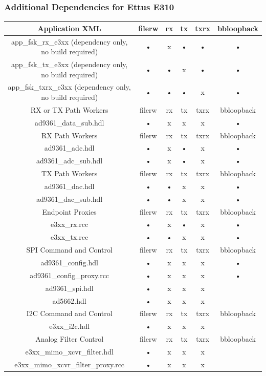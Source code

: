 \subsubsection{Additional Dependencies for Ettus E310}
	\begin{tabular}{|c|c|c|c|c|c|}
	\hline
	\rowcolor{blue}
	Application XML & filerw & rx & tx & txrx & bbloopback \\
	\hline
	app\_fsk\_rx\_e3xx (dependency only, no build required) & • & x & • & • & • \\
	\hline
	app\_fsk\_tx\_e3xx (dependency only, no build required) & • & • & x & • & • \\
	\hline
	app\_fsk\_txrx\_e3xx (dependency only, no build required) & • & •  & • & x & • \\
	\hline
	\rowcolor{blue}
	RX or TX Path Workers & filerw & rx & tx & txrx & bbloopback \\
	\hline
	ad9361\_data\_sub.hdl & • & x & x & x & • \\
	\rowcolor{blue}
	RX Path Workers & filerw & rx & tx & txrx & bbloopback \\
	\hline
	ad9361\_adc.hdl & • & x & • & x & • \\
	\hline
	ad9361\_adc\_sub.hdl & • & x & • & x & • \\
	\hline
	\rowcolor{blue}
	TX Path Workers & filerw & rx & tx & txrx & bbloopback \\
	\hline
	ad9361\_dac.hdl & • & • & x & x & • \\
	\hline
	ad9361\_dac\_sub.hdl & • & • & x & x & • \\
	\rowcolor{blue}
	Endpoint Proxies & filerw & rx & tx & txrx & bbloopback \\
	\hline
	e3xx\_rx.rcc & • & x & • & x & • \\
	\hline
	e3xx\_tx.rcc & • & • & x & x & • \\
	\hline
	\rowcolor{blue}
	SPI Command and Control & filerw & rx & tx & txrx & bbloopback \\
	\hline
	ad9361\_config.hdl & • & x & x & x & • \\
	\hline
	ad9361\_config\_proxy.rcc & • & x & x & x & •  \\
	\hline
	ad9361\_spi.hdl & • & x & x & x &   \\
	\hline
	ad5662.hdl & • & x & x & x &   \\
	\hline
	\rowcolor{blue}
	I2C Command and Control & filerw & rx & tx & txrx & bbloopback \\
	\hline
	e3xx\_i2c.hdl & • & x & x & x &   \\
	\hline
	\rowcolor{blue}
	Analog Filter Control & filerw & rx & tx & txrx & bbloopback \\
	\hline
	e3xx\_mimo\_xcvr\_filter.hdl & • & x & x & x &   \\
	\hline
	e3xx\_mimo\_xcvr\_filter\_proxy.rcc & • & x & x & x &   \\
	\hline
	\end{tabular}

